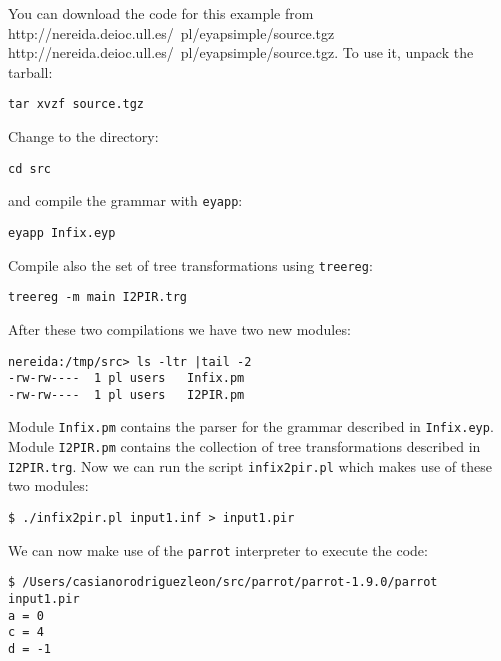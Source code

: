 You can download the code for this example from
\htmladdnormallink
{http://nereida.deioc.ull.es/~pl/eyapsimple/source.tgz}
{http://nereida.deioc.ull.es/~pl/eyapsimple/source.tgz}.
To use it, unpack the tarball:
\begin{verbatim}
tar xvzf source.tgz
\end{verbatim}
Change to the directory:
\begin{verbatim}
cd src
\end{verbatim}
and compile the grammar with \verb|eyapp|:
\begin{verbatim}
eyapp Infix.eyp
\end{verbatim}
Compile also the set of tree transformations using \verb|treereg|:
\begin{verbatim}
treereg -m main I2PIR.trg
\end{verbatim}
After these two compilations we have two new modules:
\begin{verbatim}
nereida:/tmp/src> ls -ltr |tail -2
-rw-rw----  1 pl users   Infix.pm
-rw-rw----  1 pl users   I2PIR.pm
\end{verbatim}
Module \verb|Infix.pm| contains the parser for the grammar described in \verb|Infix.eyp|.
Module \verb|I2PIR.pm| contains the collection of tree transformations described
in \verb|I2PIR.trg|. Now we can run the script \verb|infix2pir.pl| which makes use of these
two modules:
\begin{verbatim}
$ ./infix2pir.pl input1.inf > input1.pir
\end{verbatim}
We can now make use of the \verb|parrot| interpreter to execute the code:
\begin{verbatim}
$ /Users/casianorodriguezleon/src/parrot/parrot-1.9.0/parrot input1.pir 
a = 0
c = 4
d = -1
\end{verbatim}

